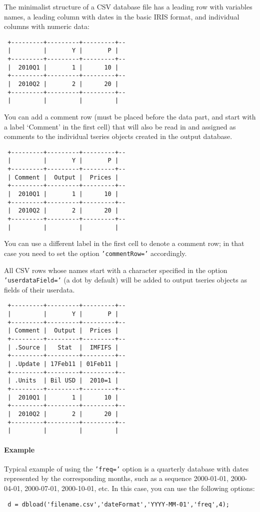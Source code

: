  The minimalist structure of a CSV database file has a leading row with
 variables names, a leading column with dates in the basic IRIS format,
 and individual columns with numeric data:
 
 \begin{verbatim}
 +---------+---------+---------+--
 |         |       Y |       P |
 +---------+---------+---------+--
 |  2010Q1 |       1 |      10 |
 +---------+---------+---------+--
 |  2010Q2 |       2 |      20 |
 +---------+---------+---------+--
 |         |         |         |
 \end{verbatim}
 
 You can add a comment row (must be placed before the data part, and
 start with a label `Comment' in the first cell) that will also be read
 in and assigned as comments to the individual tseries objects created in
 the output database.
 
 \begin{verbatim}
 +---------+---------+---------+--
 |         |       Y |       P |
 +---------+---------+---------+--
 | Comment |  Output |  Prices |
 +---------+---------+---------+--
 |  2010Q1 |       1 |      10 |
 +---------+---------+---------+--
 |  2010Q2 |       2 |      20 |
 +---------+---------+---------+--
 |         |         |         |
 \end{verbatim}
 
 You can use a different label in the first cell to denote a comment row;
 in that case you need to set the option \texttt{'commentRow='}
 accordingly.
 
 All CSV rows whose names start with a character specified in the option
 \texttt{'userdataField='} (a dot by default) will be added to output
 tseries objects as fields of their userdata.
 
 \begin{verbatim}
 +---------+---------+---------+--
 |         |       Y |       P |
 +---------+---------+---------+--
 | Comment |  Output |  Prices |
 +---------+---------+---------+--
 | .Source |   Stat  |  IMFIFS |
 +---------+---------+---------+--
 | .Update | 17Feb11 | 01Feb11 |
 +---------+---------+---------+--
 | .Units  | Bil USD |  2010=1 |
 +---------+---------+---------+--
 |  2010Q1 |       1 |      10 |
 +---------+---------+---------+--
 |  2010Q2 |       2 |      20 |
 +---------+---------+---------+--
 |         |         |         |
 \end{verbatim}
 
 \paragraph{Example}
 
 Typical example of using the \texttt{'freq='} option is a quarterly
 database with dates represented by the corresponding months, such as a
 sequence 2000-01-01, 2000-04-01, 2000-07-01, 2000-10-01, etc. In this
 case, you can use the following options:
 
 \begin{verbatim}
 d = dbload('filename.csv','dateFormat','YYYY-MM-01','freq',4);
 \end{verbatim}


